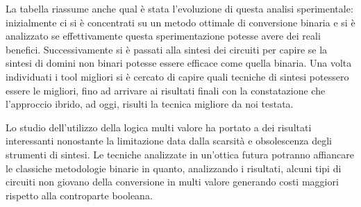 \documentclass[
]{book}
\begin{document}
La tabella riassume anche qual è stata l'evoluzione di questa analisi sperimentale: inizialmente ci si è concentrati su un metodo ottimale di conversione binaria e si è analizzato se effettivamente questa sperimentazione potesse avere dei reali benefici. Successivamente si è passati alla sintesi dei circuiti per capire se la sintesi di domini non binari potesse essere efficace come quella binaria. Una volta individuati i tool migliori si è cercato di capire quali tecniche di sintesi potessero essere le migliori, fino ad arrivare ai risultati finali con la constatazione che l'approccio ibrido, ad oggi, risulti la tecnica migliore da noi testata.

Lo studio dell'utilizzo della logica multi valore ha portato a dei risultati interessanti nonostante la limitazione data dalla scarsità e obsolescenza degli strumenti di sintesi. Le tecniche analizzate in un'ottica futura potranno affiancare le classiche metodologie binarie in quanto, analizzando i risultati, alcuni tipi di circuiti non giovano della conversione in multi valore generando costi maggiori rispetto alla controparte booleana.

\newpage

  
\end{document}
